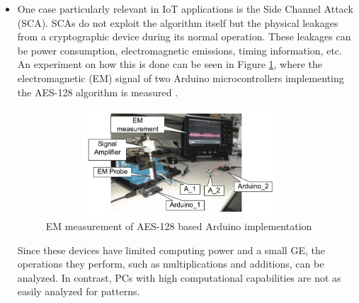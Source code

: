 \documentclass[a4paper,11pt, twoside]{article}
\begin{document}
\begin{itemize}
    \item One case particularly relevant in IoT applications is the Side Channel Attack (SCA). SCAs do not exploit the algorithm itself but the physical leakages from a cryptographic device during its normal operation. These leakages can be power consumption, electromagnetic emissions, timing information, etc. An experiment on how this is done can be seen in Figure \ref{fig:em_measurment}, where the electromagnetic (EM) signal of two Arduino microcontrollers implementing the AES-128 algorithm is measured \cite{pammu2016interceptive}.
    
        \begin{figure}[h]
            \centering
            \includegraphics[width=10cm, height=4cm]{media/em_measurment.png}
            \caption{EM measurement of AES-128 based Arduino implementation}
            \label{fig:em_measurment}
        \end{figure}

    Since these devices have limited computing power and a small GE, the operations they perform, such as multiplications and additions, can be analyzed. In contrast, PCs with high computational capabilities are not as easily analyzed for patterns.
    \end{itemize}
\end{document}
